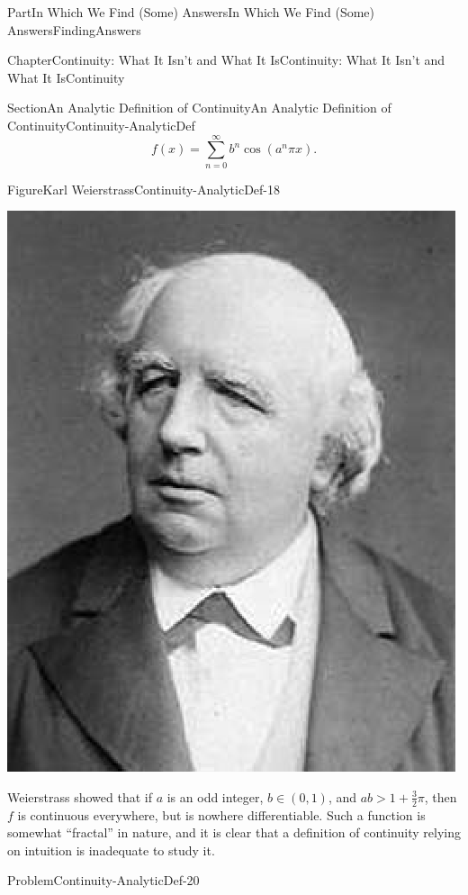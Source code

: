 \documentclass[oneside,10pt,]{book}
\numberwithin{equation}{part}
\begin{document}
\begin{partptx}{Part}{In Which We Find (Some) Answers}{}{In Which We Find (Some) Answers}{}{}{FindingAnswers}
\begin{chapterptx}{Chapter}{Continuity: What It Isn't and What It Is}{}{Continuity: What It Isn't and What It Is}{}{}{Continuity}
\begin{sectionptx}{Section}{An Analytic Definition of Continuity}{}{An Analytic Definition of Continuity}{}{}{Continuity-AnalyticDef}
\begin{equation*}
f(x)=\sum_{n=0}^\infty b^n\cos(a^n\pi x)\text{.}
\end{equation*}
%
\begin{figureptx}{Figure}{Karl Weierstrass}{Continuity-AnalyticDef-18}{}%
%
%
\begin{image}{0.325}{0.35}{0.325}{}%
\includegraphics[width=\linewidth]{external/images/Weierstrass.png}
\end{image}%
\tcblower
\end{figureptx}%
Weierstrass showed that if \(a\) is an odd integer, \(b\in(0,1)\), and \(ab>1+\frac{3}{2}\pi\), then \(f\) is continuous everywhere, but is nowhere differentiable.  Such a function is somewhat ``fractal'' in nature, and it is clear that a definition of continuity relying on intuition is inadequate to study it.%
\begin{problem}{Problem}{}{Continuity-AnalyticDef-20}%
\end{problem}
\end{sectionptx}
\end{chapterptx}
\end{partptx}
\end{document}
